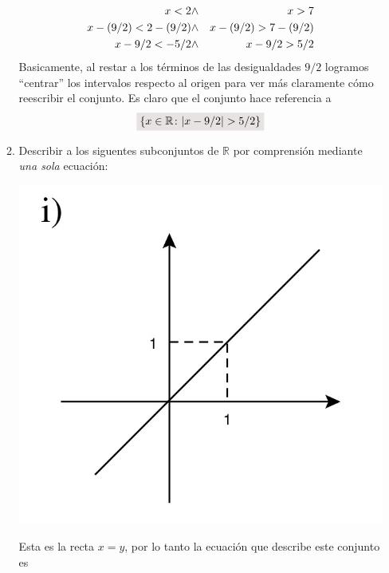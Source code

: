 \documentclass[a4paper,10pt]{article}
\newcommand{\real}{\mathbb{R}}
\newcommand{\resalta}[1]{\colorbox{g}{$\displaystyle #1$}}
\begin{document}
\begin{enumerate}
\begin{enumerate}[label = \roman*)]
           \begin{eqnarray*}
             \notag
                x<2&\wedge& x>7\\
                x-(9/2)<2-(9/2)&\wedge& x-(9/2)>7-(9/2)\\
                x -9/2<-5/2&\wedge& x-9/2>5/2
            \end{eqnarray*}
            Basicamente, al restar a los t\'erminos de las desigualdades $9/2$ logramos ``centrar'' los intervalos respecto al origen para ver m\'as claramente c\'omo reescribir el conjunto. Es claro que el conjunto hace referencia a
            \begin{equation}
                \notag\resalta{\{x \in \real \colon |x-9/2|>5/2\}}
            \end{equation}
            \item Describir a los siguentes subconjuntos de $\real$ por comprensi\'on mediante \textit{una sola} ecuaci\'on:\\
            \begin{minipage}[c]{0.3\linewidth}
                \centering
                    \includegraphics[scale=0.15]{4ii-1}
            \end{minipage}
            \begin{minipage}[c]{0.7\linewidth}
                Esta es la recta $x=y$, por lo tanto la ecuaci\'on que describe este conjunto es
                \begin{equation}

\end{equation}
\end{minipage}
\end{enumerate}
\end{enumerate}
\end{document}
